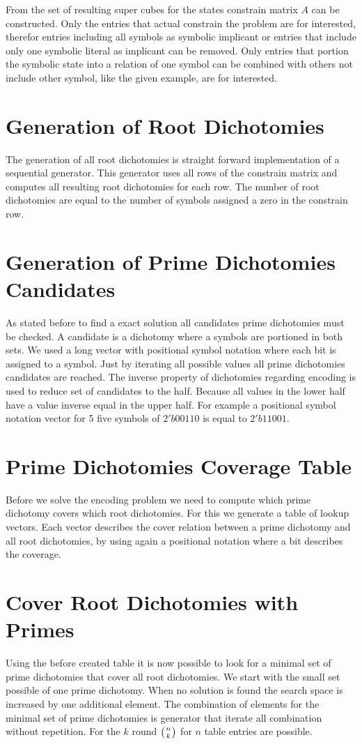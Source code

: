 From the set of resulting super cubes for the states constrain matrix $A$ can be constructed. Only the entries that actual constrain the problem are for interested, therefor entries including all symbols as symbolic implicant or entries that include only one symbolic literal as implicant can be removed. Only entries that portion the symbolic state into a relation of one symbol can be combined with others not include other symbol, like the given example, are for interested. 

\section{Generation of Root Dichotomies}
The generation of all root dichotomies is straight forward implementation of a sequential generator. This generator uses all rows of the constrain matrix and computes all resulting root dichotomies for each row. The number of root dichotomies are equal to the number of symbols assigned a zero in the constrain row.

\section{Generation of Prime Dichotomies Candidates}
As stated before to find a exact solution all candidates prime dichotomies must be checked. A candidate is a dichotomy where a symbols are portioned in both sets. We used a long vector with positional symbol notation where each bit is assigned to a symbol. Just by iterating all possible values all prime dichotomies candidates are reached. The inverse property of dichotomies regarding encoding is used to reduce set of candidates to the half. Because all values in the lower half have a value inverse equal in the upper half. For example a positional symbol notation vector for 5 five symbols of $2'b00110$ is equal to $2'b11001$.

\section{Prime Dichotomies Coverage Table}
Before we solve the encoding problem we need to compute which prime dichotomy covers which root dichotomies. For this we generate a table of lookup vectors. Each vector describes the cover relation between a prime dichotomy and all root dichotomies, by using again a positional notation where a bit describes the coverage.

\section{Cover Root Dichotomies with Primes}
Using the before created table it is now possible to look for a minimal set of prime dichotomies that cover all root dichotomies. We start with the small set possible of one prime dichotomy. When no solution is found the search space is increased by one additional element. The combination of elements for the minimal set of prime dichotomies is generator that iterate all combination without repetition. For the $k$ round $\left( n\atop k \right)$ for $n$ table entries are possible.

